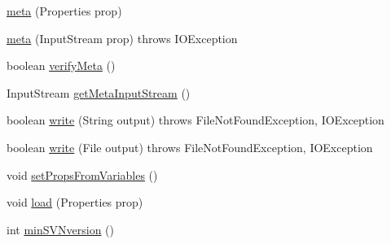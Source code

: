 \begin{DoxyCompactItemize}
\item 
\hyperlink{class_c_a_s_u_a_l_1_1caspac_1_1_script_1_1meta_a261edd605871c12eae55492b767f5d91}{meta} (Properties prop)
\item 
\hyperlink{class_c_a_s_u_a_l_1_1caspac_1_1_script_1_1meta_a82642004af42f27e39b25701f959366c}{meta} (Input\-Stream prop)  throws I\-O\-Exception 
\item 
boolean \hyperlink{class_c_a_s_u_a_l_1_1caspac_1_1_script_1_1meta_a4340eebaf11efe0a5be240ac719287c9}{verify\-Meta} ()
\item 
Input\-Stream \hyperlink{class_c_a_s_u_a_l_1_1caspac_1_1_script_1_1meta_ac00ebebaaa934593f664e4f8a992dac1}{get\-Meta\-Input\-Stream} ()
\item 
boolean \hyperlink{class_c_a_s_u_a_l_1_1caspac_1_1_script_1_1meta_abd994423729ec381ff3d2ce236981533}{write} (String output)  throws File\-Not\-Found\-Exception, I\-O\-Exception 
\item 
boolean \hyperlink{class_c_a_s_u_a_l_1_1caspac_1_1_script_1_1meta_a24fe150d261aea726080f70c0403a81e}{write} (File output)  throws File\-Not\-Found\-Exception, I\-O\-Exception 
\item 
void \hyperlink{class_c_a_s_u_a_l_1_1caspac_1_1_script_1_1meta_a356836bc34bf0e4bc68ee064277660db}{set\-Props\-From\-Variables} ()
\item 
void \hyperlink{class_c_a_s_u_a_l_1_1caspac_1_1_script_1_1meta_a2d21562b3e0b7d4fcdb1089817ab9eca}{load} (Properties prop)
\item 
int \hyperlink{class_c_a_s_u_a_l_1_1caspac_1_1_script_1_1meta_a451f01951a3e308647fc725fdcc50b7d}{min\-S\-V\-Nversion} ()
\end{DoxyCompactItemize}
